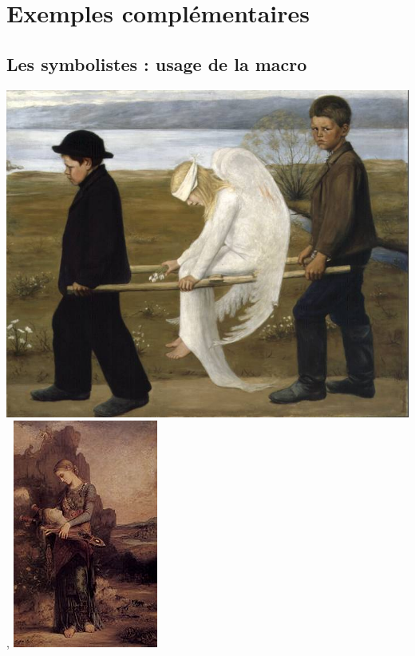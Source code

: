 
\section{Exemples complémentaires} 
\subsection{Les symbolistes :  usage de la macro }  

\begin{alterqcm}[lq=8cm,numprop=true,sep]
%
{{%
\hfil\includegraphics[scale=.20]{The_Wounded_Angel_-_Hugo_Simberg.jpg}\hfil
},{%
\hfil\includegraphics[scale=.4]{180px-Gustave_Moreau_007.jpg}\hfil
}}
\end{alterqcm}

